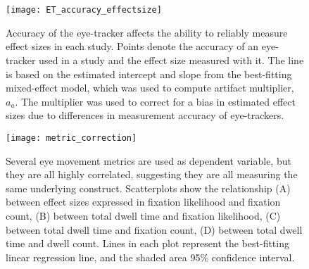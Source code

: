 
\FloatBarrier
\section{}
\label{appendix}


\begin{figure}
\texttt{[image: ET\_accuracy\_effectsize]}
\centering
\caption{Accuracy of the eye-tracker affects the ability to reliably measure effect sizes in each study. Points denote the accuracy of an eye-tracker used in a study and the effect size measured with it. The line is based on the estimated intercept and slope from the best-fitting mixed-effect model, which was used to compute artifact multiplier, $a_a$. The multiplier was used to correct for a bias in estimated effect sizes due to differences in measurement accuracy of eye-trackers.}
\label{fig:ET_accuracy_effectsize}
\end{figure}
\clearpage



\clearpage


\begin{figure}%
\texttt{[image: metric\_correction]}
\centering
\caption{Several eye movement metrics are used as dependent variable, but they are all highly correlated, suggesting they are all measuring the same underlying construct. Scatterplots show the relationship (A) between effect sizes expressed in fixation likelihood and fixation count, (B) between total dwell time and fixation likelihood, (C) between total dwell time and fixation count, (D) between total dwell time and dwell count. Lines in each plot represent the best-fitting linear regression line, and the shaded area 95\% confidence interval.}
\label{fig:metric_correction}
\end{figure}
\clearpage



\clearpage


\clearpage


\clearpage


